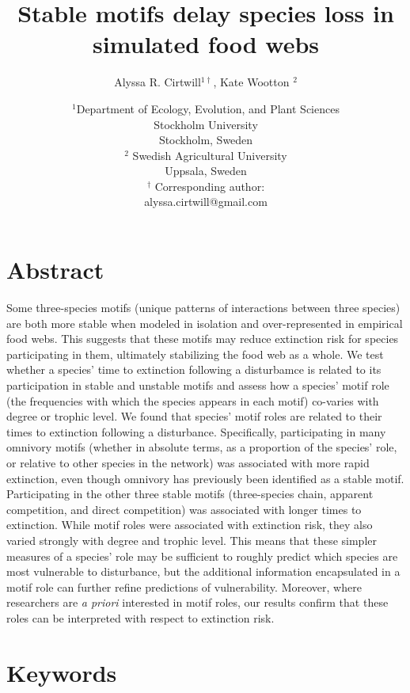 \documentclass[12pt]{article}
\title{Stable motifs delay species loss in simulated food webs}
\author{Alyssa R. Cirtwill$^{1\dagger}$, Kate Wootton $^{2}$}
\date{\small$^1$Department of Ecology, Evolution, and Plant Sciences\\ 
Stockholm University\\
Stockholm, Sweden\\
\medskip
\small$^2$ Swedish Agricultural University\\
Uppsala, Sweden\\
\medskip
$^\dagger$ Corresponding author:\\
alyssa.cirtwill@gmail.com\\
 }
\begin{document}
 
\raggedright
\setlength{\parindent}{15pt} 

\clearpage
\linenumbers
\begin{spacing}{2.0}

\section*{Abstract} %
    Some three-species motifs (unique patterns of interactions between three species) are both more stable when modeled in isolation and over-represented in empirical food webs. This suggests that these motifs may reduce extinction risk for species participating in them, ultimately stabilizing the food web as a whole. 
    We test whether a species' time to extinction following a disturbamce is related to its participation in stable and unstable motifs and assess how a species' motif role (the frequencies with which the species appears in each motif) co-varies with degree or trophic level.
    We found that species' motif roles are related to their times to extinction following a disturbance. Specifically, participating in many omnivory motifs (whether in absolute terms, as a proportion of the species' role, or relative to other species in the network) was associated with more rapid extinction, even though omnivory has previously been identified as a stable motif. Participating in the other three stable motifs (three-species chain, apparent competition, and direct competition) was associated with longer times to extinction.
    While motif roles were associated with extinction risk, they also varied strongly with degree and trophic level. This means that these simpler measures of a species' role may be sufficient to roughly predict which species are most vulnerable to disturbance, but the additional information encapsulated in a motif role can further refine predictions of vulnerability. Moreover, where researchers are \emph{a priori} interested in motif roles, our results confirm that these roles can be interpreted with respect to extinction risk.%

\section*{Keywords}


\end{spacing}
\end{document}
